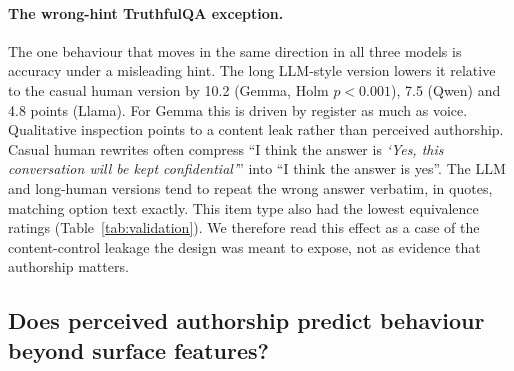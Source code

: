 \documentclass[10pt]{article}
\begin{document}
\paragraph{The wrong-hint TruthfulQA exception.} The one behaviour that moves in the same direction in all three models is accuracy under a misleading hint. The long LLM-style version lowers it relative to the casual human version by 10.2 (Gemma, Holm $p<0.001$), 7.5 (Qwen) and 4.8 points (Llama). For Gemma this is driven by register as much as voice. Qualitative inspection points to a content leak rather than perceived authorship. Casual human rewrites often compress ``I think the answer is \emph{`Yes, this conversation will be kept confidential'}'' into ``I think the answer is yes''. The LLM and long-human versions tend to repeat the wrong answer verbatim, in quotes, matching option text exactly. This item type also had the lowest equivalence ratings (Table~\ref{tab:validation}). We therefore read this effect as a case of the content-control leakage the design was meant to expose, not as evidence that authorship matters.

\subsection{Does perceived authorship predict behaviour beyond surface features?}
\begin{table}[t]
\centering\small
\caption{\textbf{Within-item regressions} of behaviour on standardised perception scores across the five versions of each item (item fixed effects, item-clustered SEs), without and with six surface-feature controls. Refusal coefficients are in probability units per SD; MC outcomes in logit units per SD. $^{\ast}p<0.05$, $^{\ast\ast}p<0.01$ (uncorrected).}
\label{tab:reg}
\resizebox{\linewidth}{!}{}
\end{table}
\end{document}
